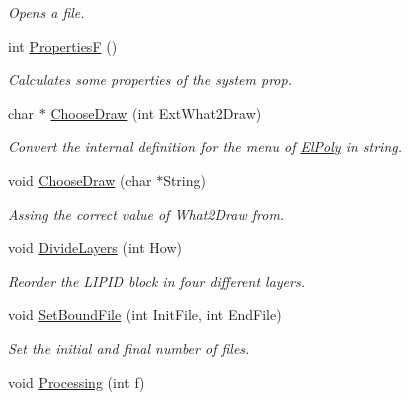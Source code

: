 \begin{DoxyCompactItemize}
\begin{DoxyCompactList}\small\item\em Opens a file. \end{DoxyCompactList}\item 
int \hyperlink{classElPoly_ae41ade7fbfd977babf42a7e2e6b33f07}{PropertiesF} ()\hypertarget{classElPoly_ae41ade7fbfd977babf42a7e2e6b33f07}{}\label{classElPoly_ae41ade7fbfd977babf42a7e2e6b33f07}

\begin{DoxyCompactList}\small\item\em Calculates some properties of the system  prop. \end{DoxyCompactList}\item 
char $\ast$ \hyperlink{classElPoly_a86e52eb42d4ead5eb6b800ab1fd3a4d2}{Choose\+Draw} (int Ext\+What2\+Draw)\hypertarget{classElPoly_a86e52eb42d4ead5eb6b800ab1fd3a4d2}{}\label{classElPoly_a86e52eb42d4ead5eb6b800ab1fd3a4d2}

\begin{DoxyCompactList}\small\item\em Convert the internal definition for the menu of \hyperlink{classElPoly}{El\+Poly} in string. \end{DoxyCompactList}\item 
void \hyperlink{classElPoly_aba70049e8fa7f7b845f9ccd8ad700015}{Choose\+Draw} (char $\ast$String)
\begin{DoxyCompactList}\small\item\em Assing the correct value of What2\+Draw from. \end{DoxyCompactList}\item 
void \hyperlink{classElPoly_acffadf1cdc641927dfd8af49eebc2069}{Divide\+Layers} (int How)\hypertarget{classElPoly_acffadf1cdc641927dfd8af49eebc2069}{}\label{classElPoly_acffadf1cdc641927dfd8af49eebc2069}

\begin{DoxyCompactList}\small\item\em Reorder the L\+I\+P\+ID block in four different layers. \end{DoxyCompactList}\item 
void \hyperlink{classElPoly_a464eca35e2fcc5f03f9f8be8702f36cc}{Set\+Bound\+File} (int Init\+File, int End\+File)\hypertarget{classElPoly_a464eca35e2fcc5f03f9f8be8702f36cc}{}\label{classElPoly_a464eca35e2fcc5f03f9f8be8702f36cc}

\begin{DoxyCompactList}\small\item\em Set the initial and final number of files. \end{DoxyCompactList}\item 
void \hyperlink{classElPoly_a02045f98c00a6ef6af607bc27fc3e82a}{Processing} (int f)\hypertarget{classElPoly_a02045f98c00a6ef6af607bc27fc3e82a}{}\label{classElPoly_a02045f98c00a6ef6af607bc27fc3e82a}


\end{DoxyCompactItemize}
